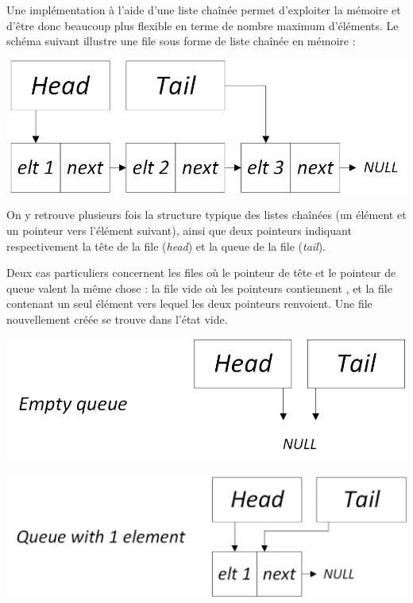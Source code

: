 \documentclass[11pt,a4paper]{article}
\begin{document}
\bigskip

Une implémentation à l'aide d'une liste chaînée permet d'exploiter la mémoire et d'être donc beaucoup plus flexible en terme de nombre maximum d'éléments.
Le schéma suivant illustre une file sous forme de liste chaînée en mémoire :\\

\begin{center}
\includegraphics[scale=0.75]{img/files/Files_3_Liste_Chainee_Structure_cas_general.png}
\end{center}

\smallskip

On y retrouve plusieurs fois la structure typique des listes chaînées (un élément et un pointeur vers l'élément suivant), ainsi que deux pointeurs indiquant respectivement la tête de la file (\textit{head}) et la queue de la file (\textit{tail}).

Deux cas particuliers concernent les files où le pointeur de tête et le pointeur de queue valent la même chose : la file vide où les pointeurs contiennent , et la file contenant un seul élément vers lequel les deux pointeurs renvoient.
Une file nouvellement créée se trouve dans l'état vide.\\

\begin{center}
\includegraphics[scale=0.75]{img/files/Files_3_Liste_Chainee_Structure_cas_vide_etiquette.png}
\end{center}

\smallskip

\begin{center}
\includegraphics[scale=0.75]{img/files/Files_3_Liste_Chainee_Structure_cas_1_elt_etiquette.png}
\end{center}
\end{document}
